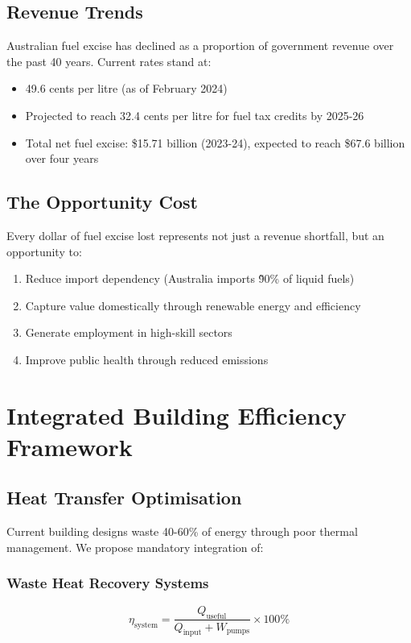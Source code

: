 \documentclass[12pt,a4paper]{article}
\begin{document}
\subsection{Revenue Trends}

Australian fuel excise has declined as a proportion of government revenue over the past 40 years. Current rates stand at:
\begin{itemize}
    \item 49.6 cents per litre (as of February 2024)
    \item Projected to reach 32.4 cents per litre for fuel tax credits by 2025-26
    \item Total net fuel excise: \$15.71 billion (2023-24), expected to reach \$67.6 billion over four years
\end{itemize}

\subsection{The Opportunity Cost}

Every dollar of fuel excise lost represents not just a revenue shortfall, but an opportunity to:
\begin{enumerate}
    \item Reduce import dependency (Australia imports \~90\% of liquid fuels)
    \item Capture value domestically through renewable energy and efficiency
    \item Generate employment in high-skill sectors
    \item Improve public health through reduced emissions
\end{enumerate}

\section{Integrated Building Efficiency Framework}

\subsection{Heat Transfer Optimisation}

Current building designs waste 40-60\% of energy through poor thermal management. We propose mandatory integration of:

\subsubsection{Waste Heat Recovery Systems}
\begin{equation}
    \eta_{\text{system}} = \frac{Q_{\text{useful}}}{Q_{\text{input}} + W_{\text{pumps}}} \times 100\%
\end{equation}
\end{document}

